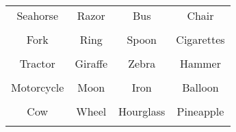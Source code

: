 \documentclass[12pt,a4paper]{article}
\begin{document}
\thispagestyle{empty}
\begin{table}[]
\centering
\Huge
\begin{tabular}{cccc}
 Seahorse& Razor& Bus& Chair\\  & & & \\
 Fork& Ring& Spoon& Cigarettes\\  & & & \\
 Tractor& Giraffe& Zebra& Hammer\\  & & & \\
 Motorcycle& Moon& Iron& Balloon\\  & & & \\
 Cow& Wheel& Hourglass& Pineapple\\  & & & \\
\end{tabular}
\end{table}
\end{document}
